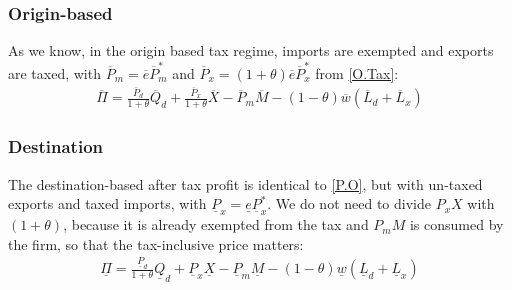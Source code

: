 \subsubsection*{Origin-based}
As we know, in the origin based tax regime, imports are exempted and exports are taxed, with $\overline P_m = \overline e \overline P_m^*$ and $\overline P_x = (1+\theta) \overline e \overline P_x^* $ from \eqref{O.Tax}: 
\begin{equation}\label{P.O}
\begin{aligned}
\overline \Pi = \frac{\overline P_d}{1+\theta}\overline Q_d + \frac{\overline P_x}{1+\theta}\overline X - \overline P_m \overline M -  \left( 1-\theta \right) \overline w  \left( \overline L_d + \overline L_x \right)  
\end{aligned}
\end{equation}

\subsubsection*{Destination}
The destination-based after tax profit is identical to \eqref{P.O}, but with un-taxed exports and taxed imports, with $\underline P_x =  \underline e \underline P_x^* $. We do not need to divide $P_x X$ with $(1+\theta)$, because it is already exempted from the tax and $P_m M$ is consumed by the firm, so that the tax-inclusive price matters:
\begin{equation}\label{P.D}
\begin{aligned}
\underline \Pi = \frac{\underline P_d}{1+\theta}\underline Q_d +\underline P_x\underline X - \underline P_m \underline M -  \left( 1-\theta \right) \underline w  \left( \underline L_d + \underline L_x \right) 
\end{aligned}
\end{equation}

